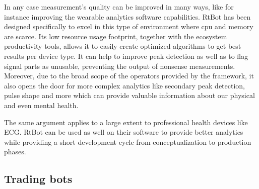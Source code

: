 \documentclass[preprint,1p,times]{elsarticle}
\begin{document}
In any case measurement's quality can be improved in many ways, like for instance improving the wearable 
analytics software capabilities. RtBot has been designed specifically to excel in this type of environment 
where cpu and memory are scarce. Its low resource usage footprint, together with the ecosystem productivity 
tools, allows it to easily create optimized algorithms to get best results per device type. It can help to 
improve peak detection as well as to flag signal parts as unusable, preventing the output of nonsense 
measurements. Moreover, due to the broad scope of the operators provided by the framework, it also opens 
the door for more complex analytics like secondary peak detection, pulse shape and more which can provide 
valuable information about our physical and even mental health.

The same argument applies to a large extent to professional health devices like ECG. RtBot can be used as 
well on their software to provide better analytics while providing a short development cycle from 
conceptualization to production phases.

\subsection{Trading bots}






\begin{thebibliography}{00}


\bibitem{}

\end{thebibliography}
\end{document}
